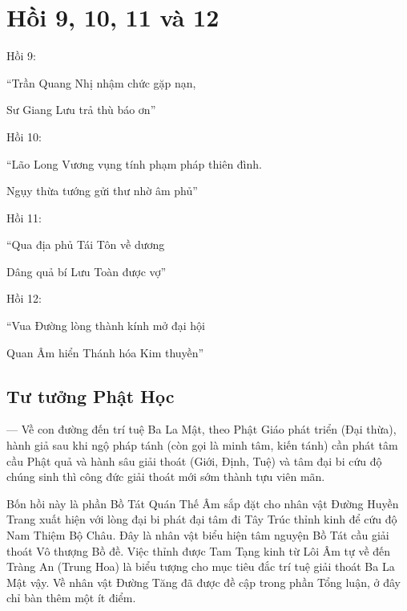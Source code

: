 \chapter{Hồi 9, 10, 11 và 12} %
\label{cha:hoi_9_10_11_và_12}
Hồi 9:

\begin{itshape}
``Trần Quang Nhị nhậm chức gặp nạn,

Sư Giang Lưu trả thù báo ơn''
\end{itshape}

Hồi 10:

\begin{itshape}
``Lão Long Vương vụng tính phạm pháp thiên đình.

Ngụy thừa tướng gửi thư nhờ âm phủ''
\end{itshape}

Hồi 11:

\begin{itshape}
``Qua địa phủ Tái Tôn về dương

Dâng quả bí Lưu Toàn được vợ''
\end{itshape}

Hồi 12:

\begin{itshape}
``Vua Đường lòng thành kính mở đại hội

Quan Âm hiển Thánh hóa Kim thuyền''
\end{itshape}

\section{Tư tưởng Phật Học} %
\label{sec:9_phat_hoc}

— Về con đường đến trí tuệ Ba La Mật, theo Phật Giáo phát triển (Đại thừa), hành giả sau khi ngộ pháp tánh (còn gọi là minh tâm, kiến tánh) cần phát tâm cầu Phật quả và hành sâu giải thoát (Giới, Định, Tuệ) và tâm đại bi cứu độ chúng sinh thì công đức giải thoát mới sớm thành tựu viên mãn.

Bốn hồi này là phần Bồ Tát Quán Thế Âm sắp đặt cho nhân vật Đường Huyền Trang xuất hiện với lòng đại bi phát đại tâm đi Tây Trúc thỉnh kinh để cứu độ Nam Thiệm Bộ Châu. Đây là nhân vật biểu hiện tâm nguyện Bồ Tát cầu giải thoát Vô thượng Bồ đề. Việc thỉnh được Tam Tạng kinh từ Lôi Âm tự về đến Tràng An (Trung Hoa) là biểu tượng cho mục tiêu đắc trí tuệ giải thoát Ba La Mật vậy. Về nhân vật Đường Tăng đã được đề cập trong phần Tổng luận, ở đây chỉ bàn thêm một ít điểm.


